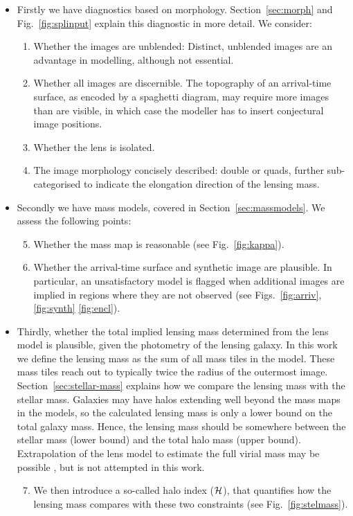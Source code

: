\begin{itemize}
\item Firstly we have diagnostics based on morphology.
  Section~\ref{sec:morph} and Fig.~\ref{fig:splinput} explain
  this diagnostic in more detail. We consider:
\begin{enumerate}
\item Whether the images are unblended:  Distinct, unblended images are
  an advantage in modelling, although not essential.
\item Whether all images are discernible.  The topography of an
  arrival-time surface, as encoded by a spaghetti diagram, may require
  more images than are visible, in which case the modeller has to
  insert conjectural image positions.
\item Whether the lens is isolated.
\item The image morphology concisely described: double or quads,
  further sub-categorised to indicate the elongation direction of the
  lensing mass.
\end{enumerate}
\item Secondly we have mass models, covered in Section~\ref{sec:massmodels}.
  We assess the following points:
\begin{enumerate}
\setcounter{enumi}{4}
\item Whether the mass map is reasonable (see Fig.~\ref{fig:kappa}).
\item Whether the arrival-time surface and synthetic image are
  plausible. In particular, an unsatisfactory model is flagged when 
  additional images are implied in regions
  where they are not observed (see Figs.~\ref{fig:arriv}, \ref{fig:synth} \ref{fig:encl}).
\end{enumerate}
\item Thirdly, whether the total implied lensing mass determined from
  the lens model is plausible, given the photometry of the lensing
  galaxy.  In this work we define the lensing mass as the sum of all
  mass tiles in the model.  These mass tiles reach out to typically
  twice the radius of the outermost image.
  Section~\ref{sec:stellar-mass} explains how we compare the lensing
  mass with the stellar mass.  Galaxies may have halos extending well
  beyond the mass maps in the models, so the calculated lensing mass
  is only a lower bound on the total galaxy mass.  Hence, the lensing
  mass should be somewhere between the stellar mass (lower bound) and
  the total halo mass (upper bound).  Extrapolation of the lens model
  to estimate the full virial mass may be possible
  \citep[cf.][]{2012MNRAS.424..104L}, but is not attempted in this
  work.
\begin{enumerate}
\setcounter{enumi}{6}
\item We then introduce a so-called halo index ($\mathcal{H}$), that
  quantifies how the lensing mass compares with these two
  constraints (see Fig.~\ref{fig:stelmass}).
\end{enumerate}
\end{itemize}






